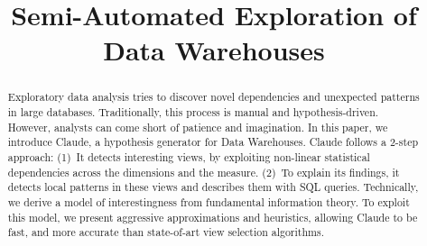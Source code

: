\documentclass{sig-alternate}
\begin{document}
\title{Semi-Automated Exploration of Data Warehouses}



\maketitle

\begin{abstract}
Exploratory data analysis tries to discover novel dependencies and unexpected
patterns in large databases. Traditionally, this process is manual and
hypothesis-driven. However, analysts can come short of patience and
imagination. In this paper, we introduce Claude, a hypothesis generator for
Data Warehouses. Claude follows a 2-step approach: (1)~It detects interesting
views, by exploiting non-linear statistical dependencies across the dimensions
and the measure. (2)~To explain its findings, it detects local patterns in
these views and describes them with SQL queries.  Technically, we derive a
model of interestingness from fundamental information theory. To exploit this
model, we present aggressive approximations and heuristics, allowing Claude to
be fast, and more accurate than state-of-art view selection algorithms. 
\end{abstract}




\balancecolumns
\end{document}
